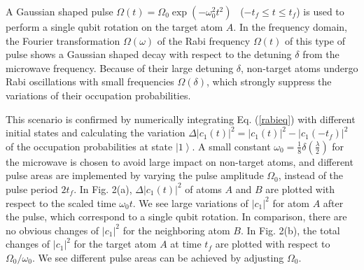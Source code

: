 \documentclass[pra,aps,showpacs,twocolumn]{revtex4}
\begin{document}
A Gaussian shaped pulse $\Omega \left( t\right) =\Omega _{0}\exp \left(
-\omega _{0}^{2}t^{2}\right) $ \ ($-t_{f}\leq t\leq t_{f}$) is used to
perform a single qubit rotation on the target atom $A$. In the frequency
domain, the Fourier transformation $\Omega \left( \omega \right) $ of the
Rabi frequency $\Omega \left( t\right) $ of this type of pulse shows a
Gaussian shaped decay with respect to the detuning $\delta $ from the
microwave frequency. Because of their large detuning $\delta $, non-target
atoms undergo Rabi oscillations with small frequencies $\Omega \left( \delta
\right) $, which strongly suppress the variations of their occupation
probabilities.

This scenario is confirmed by numerically integrating Eq. (\ref{rabieq})
with different initial states and calculating the variation $\Delta
|c_{1}(t)|^{2}=|c_{1}(t)|^{2}-|c_{1}(-t_{f})|^{2}$ of the occupation
probabilities at state $\left\vert 1\right\rangle $. A small constant $%
\omega _{0}=\frac{1}{8}\delta \left( \frac{\lambda }{2}\right) $ for the
microwave is chosen to avoid large impact on non-target atoms, and different
pulse areas are implemented by varying the pulse amplitude $\Omega _{0}$,
instead of the pulse period $2t_{f}$. In Fig. 2(a), $\Delta |c_{1}(t)|^{2}$
of atoms $A$ and $B$ are plotted with respect to the scaled time $\omega
_{0}t$. We see large variations of $\left\vert c_{1}\right\vert ^{2}$ for
atom $A$ after the pulse, which correspond to a single qubit rotation. In
comparison, there are no obvious changes of $\left\vert c_{1}\right\vert
^{2} $ for the neighboring atom $B$. In Fig. 2(b), the total changes of $%
\left\vert c_{1}\right\vert ^{2}$ for the target atom $A$ at time $t_{f}$
are plotted with respect to $\Omega _{0}/\omega _{0}$. We see different
pulse areas can be achieved by adjusting $\Omega _{0}$.
\end{document}
